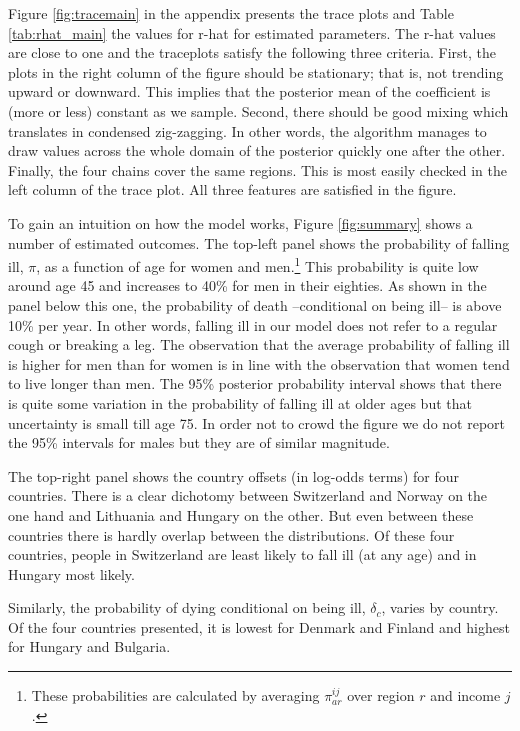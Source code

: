 \documentclass[a4paper,12pt]{article}
\begin{document}
Figure \ref{fig:tracemain} in the appendix presents the trace plots and Table \ref{tab:rhat_main} the values for r-hat for estimated parameters. The r-hat values are close to one and the traceplots satisfy the following three criteria. First, the plots in the right column of the figure should be stationary; that is, not trending upward or downward. This implies that the posterior mean of the coefficient is (more or less) constant as we sample. Second, there should be good mixing which translates in condensed zig-zagging. In other words, the algorithm manages to draw values across the whole domain of the posterior quickly one after the other. Finally, the four chains cover the same regions. This is most easily checked in the left column of the trace plot. All three features are satisfied in the figure.

To gain an intuition on how the model works, Figure \ref{fig:summary} shows a number of estimated outcomes. The top-left panel shows the probability of falling ill, \(\pi\), as a function of age for women and men.\footnote{These probabilities are calculated by averaging \(\pi_{ar}^{ij}\) over region \(r\) and income \(j\).} This probability is quite low around age 45 and increases to 40\% for men in their eighties. As shown in the panel below this one, the probability of death --conditional on being ill-- is above 10\% per year. In other words, falling ill in our model  does not refer to a regular cough or breaking a leg. The observation that the average probability of falling ill is higher for men than for women is in line with the observation that women tend to live longer than men. The 95\% posterior probability interval shows that there is quite some variation in the probability of falling ill at older ages but that uncertainty is small till age 75. In order not to crowd the figure we do not report the 95\% intervals for males but they are of similar magnitude.

The top-right panel shows the country offsets (in log-odds terms) for four countries. There is a clear dichotomy between Switzerland and Norway on the one hand and Lithuania and Hungary on the other. But even between these countries there is hardly overlap between the distributions. Of these four countries, people in Switzerland are least likely to fall ill (at any age) and in Hungary most likely.

Similarly, the probability of dying conditional on being ill, \(\delta_{c}\), varies by country. Of the four countries presented, it is lowest for Denmark and Finland and highest for Hungary and Bulgaria.
\end{document}
